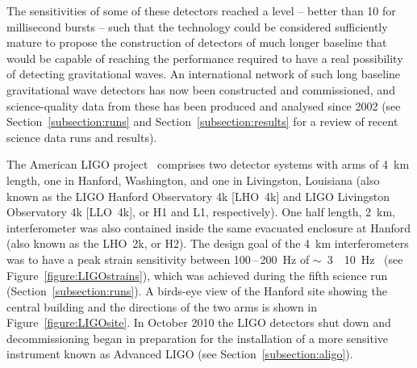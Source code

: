 \documentclass{article}
\newcommand{\Hz}{Hz\super{-1/2}\xspace}
\begin{document}
The sensitivities of some of these detectors reached a level -- better than
10 for millisecond bursts -- such that the technology could be
considered sufficiently mature to propose the construction of detectors of much
longer baseline that would be capable of reaching the performance required to
have a real possibility of detecting gravitational waves.  An international
network of such long baseline gravitational wave detectors has now been
constructed and commissioned, and science-quality data from these has been
produced and analysed since 2002 (see Section~\ref{subsection:runs} and
Section~\ref{subsection:results} for a review of recent science data runs and
results).

The American LIGO project~\cite{LIGOweb} comprises two detector systems with
arms of 4~km length, one in Hanford, Washington, and one in Livingston,
Louisiana (also known as the LIGO Hanford Observatory 4k [LHO~4k] and LIGO
Livingston Observatory 4k [LLO~4k], or H1 and L1, respectively). One half length,
2~km, interferometer was also contained inside the same evacuated enclosure at
Hanford (also known as the LHO~2k, or H2). The design goal of the 4~km
interferometers was to have a peak strain sensitivity between 100\,--\,200~Hz of
$\sim$~3~\texttimes~10~\Hz~\cite{LIGOSRD} (see
Figure~\ref{figure:LIGOstrains}), which was achieved during the fifth science run
(Section~\ref{subsection:runs}). A birds-eye view of the Hanford site showing the
central building and the directions of the two arms is shown in
Figure~\ref{figure:LIGOsite}. In October 2010 the LIGO detectors shut down and
decommissioning began in preparation for the installation of a more sensitive
instrument known as Advanced LIGO (see Section~\ref{subsection:aligo}).

\end{document}
